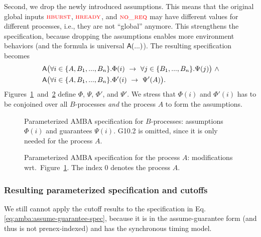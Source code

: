   Second, we drop the newly introduced assumptions.
  This means that the original global inputs $\textsc{\textcolor{red}{hburst}}$, $\textsc{\textcolor{red}{hready}}$, and $\textsc{\textcolor{red}{no\_req}}$ may have different values for different processes,
  i.e., they are not ``global'' anymore.
  This strengthens the specification,
  because dropping the assumptions enables more environment behaviors (and the formula is universal ${\operatorname{\mathsf{A}}}(...)$).
  The resulting specification becomes
  \begin{equation}\label{eq:amba:assume-guarantee-spec}
  \begin{aligned}
  &{\operatorname{\mathsf{A}}}\big(\forall{i \in \{A,B_1,...,B_n\}}. \Phi(i) ~\rightarrow~ \forall{j \in \{B_1,...,B_n\}}. \Psi(j)\big) ~\land\\
  &{\operatorname{\mathsf{A}}}\big(\forall{i \in \{A,B_1,...,B_n\}}. \Phi'(i) ~\rightarrow~ \Psi'(A)\big).
  \end{aligned}
  \end{equation}
  Figures~\ref{fig:AMBASpecNewI}~and~\ref{fig:AMBASpecNew0} define $\Phi$, $\Psi$, $\Phi'$, and $\Psi'$.
  We stress that $\Phi(i)$ and $\Phi'(i)$
  has to be conjoined over all $B$-processes \emph{and} the process $A$ to form the assumptions.

  \begin{figure}%
    \fbox{%
    \begin{minipage}{\textwidth}
    
    \end{minipage}
    }
    \caption{Parameterized AMBA specification for $B$-processes:
      assumptions $\Phi(i)$ and guarantees $\Psi(i)$.
      G10.2 is omitted, since it is only needed for the process $A$.%
    }
    \label{fig:AMBASpecNewI}
  \end{figure}
  \begin{figure}%
    \fbox{%
    \begin{minipage}{\textwidth}
    
    \end{minipage}}
    \caption{Parameterized AMBA specification for the process $A$:
      modifications wrt.\ Figure~\ref{fig:AMBASpecNewI}.
      The index $0$ denotes the process $A$.%
    }
    \label{fig:AMBASpecNew0}
  \end{figure}

\subsubsection{Resulting parameterized specification and cutoffs}

  We still cannot apply the cutoff results to the specification in Eq.\ref{eq:amba:assume-guarantee-spec},
  because it is in the assume-guarantee form (and thus is not prenex-indexed)
  and has the synchronous timing model.

